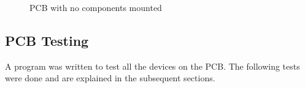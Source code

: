 \begin{figure}
\caption{PCB with no components mounted}
\label{fig:PCB:Bare}
\end{figure}

\subsection{PCB Testing}
A program was written to test all the devices on the PCB. The following tests were done and are explained in the subsequent sections.%


